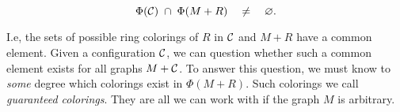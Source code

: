 \begin{equation}
    \Phi(\mathcal{C}) \;\cap\; \Phi(M+R) \quad \neq \quad\varnothing.
\end{equation}

I.e, the sets of possible ring colorings of $R$ in $\mathcal{C}$ and $M+R$ have a common element. Given a configuration $\mathcal{C}$, we can question whether such a common element exists for all graphs $M + \mathcal{C}$. To answer this question, we must know to \textit{some} degree which colorings exist in $\Phi(M+R)$. Such colorings we  call \textit{guaranteed colorings}. They are all we can work with if the graph $M$ is arbitrary.


